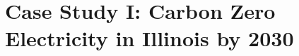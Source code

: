 \documentclass[edeposit,fullpage,11pt]{uiucthesis2018}
\begin{document}
% 

\chapter{Case Study I: Carbon Zero Electricity in Illinois by 2030}
\label{chapter:illinois}

%
%
%
% 

\backmatter



\end{document}
